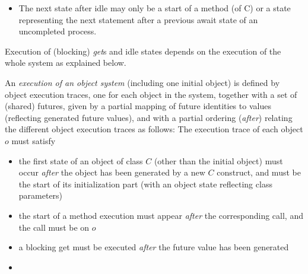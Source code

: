 {\begin{definition}
\begin{itemize}
\item
The next state after idle may only be a start of a  method (of C)
or a state representing the next statement
after a previous await state
of an uncompleted process.
\end{itemize}\end{definition}
Execution of (blocking) \emph{get}s  and idle states 
depends on the  execution of  the whole  system as explained below.

\begin{definition}\label{def-system-ex}
An \emph{execution of an object system} (including one initial  object)  is defined by 
object execution traces, one for each object in the system,
together with a set of (shared) futures, given by a partial mapping of
future identities to values (reflecting generated future values), and
with a partial ordering 
(\emph{after}) relating the different object execution traces as
follows: The execution trace of each object $o$ must satisfy
\begin{itemize}
\item the first state of an object of class $C$
(other than the initial object)
must occur \emph{after}
the object has been generated by a new $C$ construct,
and must be the start of its initialization part (with an object state
reflecting class parameters)
\item the start of a method execution must
appear \emph{after} the corresponding call, and the call must be on $o$
\item a blocking get must be executed \emph{after} the future value has been generated
\item 

\end{itemize}
\end{definition}}
